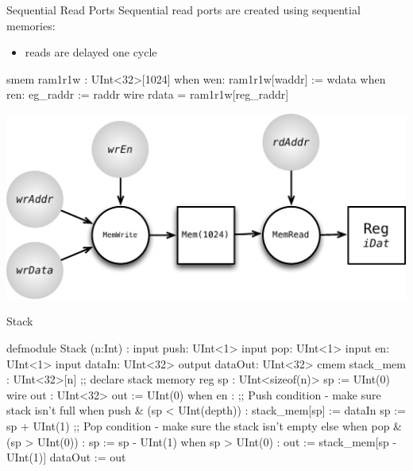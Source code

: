 \documentclass[xcolor=pdflatex,dvipsnames,table]{beamer}
\begin{document}
\begin{frame}[fragile]{Sequential Read Ports}
Sequential read ports are created using sequential memories:
\begin{itemize}
\item reads are delayed one cycle
\end{itemize}

\begin{stanza}
smem ram1r1w : UInt<32>[1024]
when wen: ram1r1w[waddr] := wdata
when ren: eg_raddr := raddr
wire rdata = ram1r1w[reg_raddr]
\end{stanza}

\begin{center}
\includegraphics[height=0.4\textheight]{figs/mem-seq-read.pdf} 
\end{center}

\end{frame}

\begin{frame}[fragile]{Stack}

{
\begin{stanza}
defmodule Stack (n:Int) :
  input push: UInt<1>
  input pop: UInt<1>
  input en: UInt<1>
  input dataIn: UInt<32>
  output dataOut: UInt<32>
  cmem stack_mem : UInt<32>[n] ;; declare stack memory
  reg sp : UInt<sizeof(n)> sp := UInt(0)
  wire out : UInt<32> out := UInt(0)
  when en :
    ;; Push condition - make sure stack isn't full
    when push & (sp < UInt(depth)) :
      stack_mem[sp] := dataIn
      sp := sp + UInt(1)
    ;; Pop condition - make sure the stack isn't empty
    else when pop & (sp > UInt(0)) :
      sp := sp - UInt(1)
    when sp > UInt(0) :
      out := stack_mem[sp - UInt(1)]
  dataOut := out
\end{stanza}
}

\end{frame}
\end{document}
